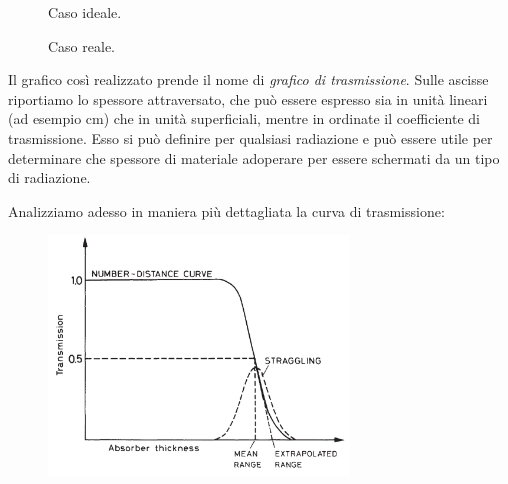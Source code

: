 \begin{minipage}{0.5\textwidth}
    \begin{figure}[H]
      \centering
      \caption*{Caso ideale.}
    \end{figure}
  \end{minipage}
  \begin{minipage}{0.5\textwidth}
    \begin{figure}[H]
      \centering
      \caption*{Caso reale.}
    \end{figure}
\end{minipage}

\vspace{0.3cm}Il grafico così realizzato prende il nome di \textit{grafico di trasmissione}. Sulle ascisse riportiamo lo spessore attraversato, che può essere espresso sia in unità lineari (ad esempio cm) che in unità superficiali, mentre in ordinate il coefficiente di trasmissione. Esso si può definire per qualsiasi radiazione e può essere utile per determinare che spessore di materiale adoperare per essere schermati da un tipo di radiazione.

Analizziamo adesso in maniera più dettagliata la curva di trasmissione:

\vspace{-0.3cm}

\begin{figure}[H]
    \centering
    \includegraphics[width=8cm]{immagini/straggling.png}
\end{figure}

